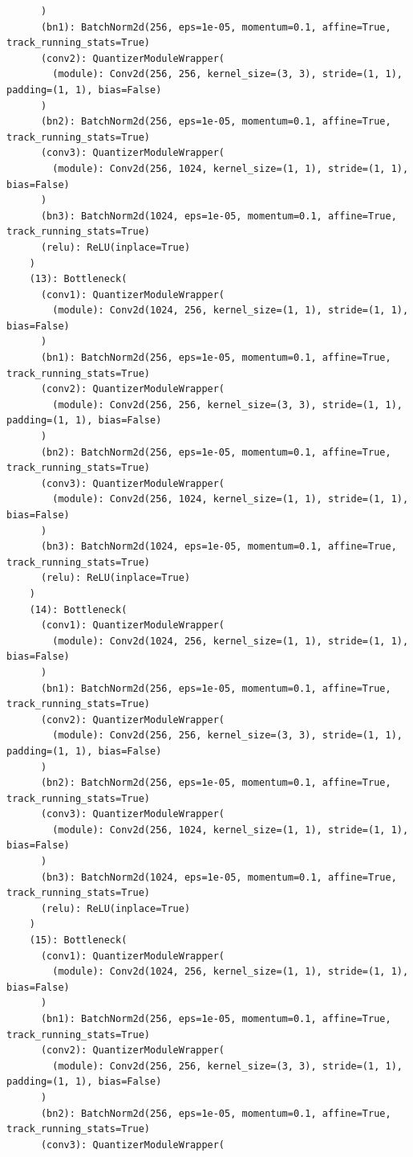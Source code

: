 \documentclass{article}
\begin{document}
\begin{verbatim}
      )
      (bn1): BatchNorm2d(256, eps=1e-05, momentum=0.1, affine=True, track_running_stats=True)
      (conv2): QuantizerModuleWrapper(
        (module): Conv2d(256, 256, kernel_size=(3, 3), stride=(1, 1), padding=(1, 1), bias=False)
      )
      (bn2): BatchNorm2d(256, eps=1e-05, momentum=0.1, affine=True, track_running_stats=True)
      (conv3): QuantizerModuleWrapper(
        (module): Conv2d(256, 1024, kernel_size=(1, 1), stride=(1, 1), bias=False)
      )
      (bn3): BatchNorm2d(1024, eps=1e-05, momentum=0.1, affine=True, track_running_stats=True)
      (relu): ReLU(inplace=True)
    )
    (13): Bottleneck(
      (conv1): QuantizerModuleWrapper(
        (module): Conv2d(1024, 256, kernel_size=(1, 1), stride=(1, 1), bias=False)
      )
      (bn1): BatchNorm2d(256, eps=1e-05, momentum=0.1, affine=True, track_running_stats=True)
      (conv2): QuantizerModuleWrapper(
        (module): Conv2d(256, 256, kernel_size=(3, 3), stride=(1, 1), padding=(1, 1), bias=False)
      )
      (bn2): BatchNorm2d(256, eps=1e-05, momentum=0.1, affine=True, track_running_stats=True)
      (conv3): QuantizerModuleWrapper(
        (module): Conv2d(256, 1024, kernel_size=(1, 1), stride=(1, 1), bias=False)
      )
      (bn3): BatchNorm2d(1024, eps=1e-05, momentum=0.1, affine=True, track_running_stats=True)
      (relu): ReLU(inplace=True)
    )
    (14): Bottleneck(
      (conv1): QuantizerModuleWrapper(
        (module): Conv2d(1024, 256, kernel_size=(1, 1), stride=(1, 1), bias=False)
      )
      (bn1): BatchNorm2d(256, eps=1e-05, momentum=0.1, affine=True, track_running_stats=True)
      (conv2): QuantizerModuleWrapper(
        (module): Conv2d(256, 256, kernel_size=(3, 3), stride=(1, 1), padding=(1, 1), bias=False)
      )
      (bn2): BatchNorm2d(256, eps=1e-05, momentum=0.1, affine=True, track_running_stats=True)
      (conv3): QuantizerModuleWrapper(
        (module): Conv2d(256, 1024, kernel_size=(1, 1), stride=(1, 1), bias=False)
      )
      (bn3): BatchNorm2d(1024, eps=1e-05, momentum=0.1, affine=True, track_running_stats=True)
      (relu): ReLU(inplace=True)
    )
    (15): Bottleneck(
      (conv1): QuantizerModuleWrapper(
        (module): Conv2d(1024, 256, kernel_size=(1, 1), stride=(1, 1), bias=False)
      )
      (bn1): BatchNorm2d(256, eps=1e-05, momentum=0.1, affine=True, track_running_stats=True)
      (conv2): QuantizerModuleWrapper(
        (module): Conv2d(256, 256, kernel_size=(3, 3), stride=(1, 1), padding=(1, 1), bias=False)
      )
      (bn2): BatchNorm2d(256, eps=1e-05, momentum=0.1, affine=True, track_running_stats=True)
      (conv3): QuantizerModuleWrapper(

\end{verbatim}
\end{document}
